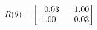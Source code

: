 \documentclass[preview]{standalone}
\begin{document}
\begin{align*}
\special{dvisvgm:raw <g id='unique000'>}R(\theta) = \begin{bmatrix}-0.03 & -1.00\\1.00 & -0.03\end{bmatrix}\special{dvisvgm:raw </g>}
\end{align*}
\end{document}
